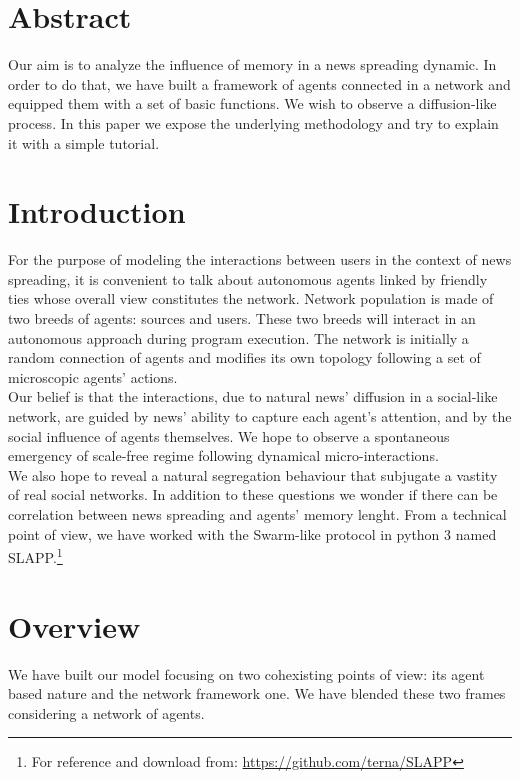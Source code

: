 \section*{Abstract}
Our aim is to analyze the influence of memory in a news spreading dynamic. In order to do that, we have built a framework of agents 
connected in a network and equipped them with a set of basic functions. We wish to observe a diffusion-like process.
In this paper we expose the underlying methodology and try to explain it with a simple tutorial.
\section{Introduction}

For the purpose of modeling the interactions between users in the context of news spreading, it is convenient to talk about autonomous agents
linked by friendly ties whose overall view constitutes the network.
Network population is made of two breeds of agents: sources and users. These two breeds will interact
in an autonomous approach during program execution.
The network is initially a random connection of agents and modifies its own topology following a set of microscopic agents' actions.
\\Our belief is that the interactions, due to natural news' diffusion in a social-like network, are guided by news' ability to capture each agent's attention, and by the social influence of agents themselves.
We hope to observe a spontaneous emergency of scale-free regime following dynamical micro-interactions.\\ We also hope to reveal 
a natural segregation behaviour that subjugate a vastity of real social networks.
In addition to these questions we wonder if there can be correlation between news spreading and agents' memory lenght.
From a technical point of view, we have worked with the Swarm-like protocol in python 3 named SLAPP.\footnote{For reference and download from: \url{https://github.com/terna/SLAPP}}

\section{Overview}
We have built our model focusing on two cohexisting points of view: its agent based nature and the network framework one. 
We have blended these two frames considering a network of agents. 
